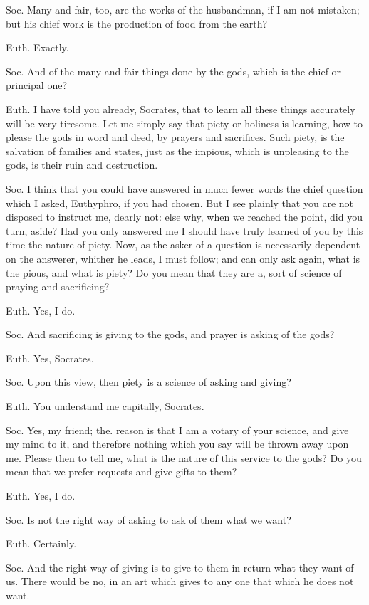 Soc. Many and fair, too, are the works of the husbandman, if I am not mistaken; but his chief work is the production of food from the earth?

Euth. Exactly.

Soc. And of the many and fair things done by the gods, which is the chief or principal one?

Euth. I have told you already, Socrates, that to learn all these things accurately will be very tiresome. Let me simply say that piety or holiness is learning, how to please the gods in word and deed, by prayers and sacrifices. Such piety, is the salvation of families and states, just as the impious, which is unpleasing to the gods, is their ruin and destruction.

Soc. I think that you could have answered in much fewer words the chief question which I asked, Euthyphro, if you had chosen. But I see plainly that you are not disposed to instruct me, dearly not: else why, when we reached the point, did you turn, aside? Had you only answered me I should have truly learned of you by this time the nature of piety. Now, as the asker of a question is necessarily dependent on the answerer, whither he leads, I must follow; and can only ask again, what is the pious, and what is piety? Do you mean that they are a, sort of science of praying and sacrificing?

Euth. Yes, I do.

Soc. And sacrificing is giving to the gods, and prayer is asking of the gods?

Euth. Yes, Socrates.

Soc. Upon this view, then piety is a science of asking and giving?

Euth. You understand me capitally, Socrates.

Soc. Yes, my friend; the. reason is that I am a votary of your science, and give my mind to it, and therefore nothing which you say will be thrown away upon me. Please then to tell me, what is the nature of this service to the gods? Do you mean that we prefer requests and give gifts to them?

Euth. Yes, I do.

Soc. Is not the right way of asking to ask of them what we want?

Euth. Certainly.

Soc. And the right way of giving is to give to them in return what they want of us. There would be no, in an art which gives to any one that which he does not want.

